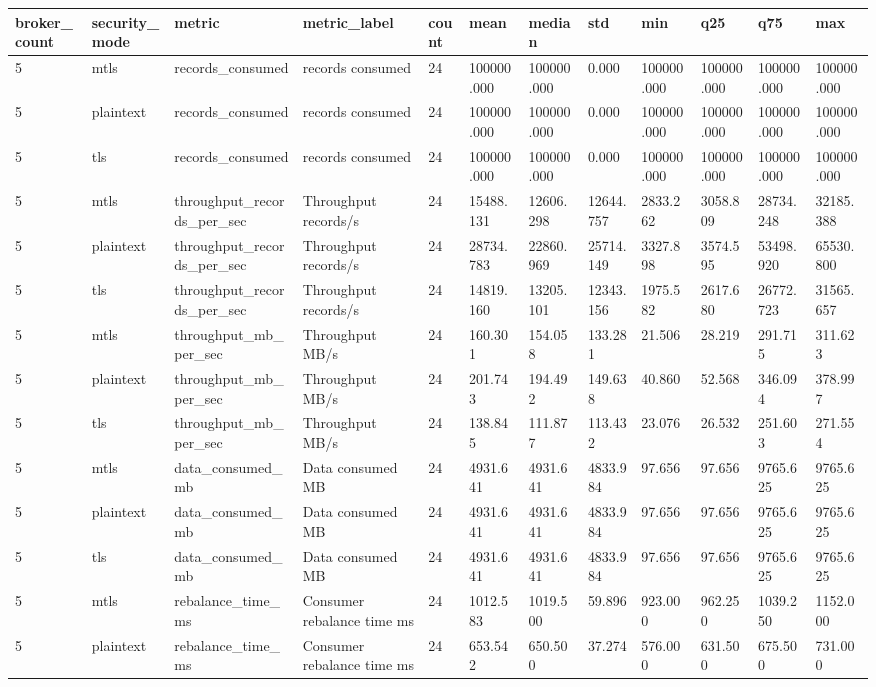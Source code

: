 \begin{longtable}{llllllllllll}
\hline
broker\_count & security\_mode & metric & metric\_label & count & mean & median & std & min & q25 & q75 & max \\
\hline
5 & mtls & records\_consumed & records consumed & 24 & 100000.000 & 100000.000 & 0.000 & 100000.000 & 100000.000 & 100000.000 & 100000.000 \\
5 & plaintext & records\_consumed & records consumed & 24 & 100000.000 & 100000.000 & 0.000 & 100000.000 & 100000.000 & 100000.000 & 100000.000 \\
5 & tls & records\_consumed & records consumed & 24 & 100000.000 & 100000.000 & 0.000 & 100000.000 & 100000.000 & 100000.000 & 100000.000 \\
5 & mtls & throughput\_records\_per\_sec & Throughput records/s & 24 & 15488.131 & 12606.298 & 12644.757 & 2833.262 & 3058.809 & 28734.248 & 32185.388 \\
5 & plaintext & throughput\_records\_per\_sec & Throughput records/s & 24 & 28734.783 & 22860.969 & 25714.149 & 3327.898 & 3574.595 & 53498.920 & 65530.800 \\
5 & tls & throughput\_records\_per\_sec & Throughput records/s & 24 & 14819.160 & 13205.101 & 12343.156 & 1975.582 & 2617.680 & 26772.723 & 31565.657 \\
5 & mtls & throughput\_mb\_per\_sec & Throughput MB/s & 24 & 160.301 & 154.058 & 133.281 & 21.506 & 28.219 & 291.715 & 311.623 \\
5 & plaintext & throughput\_mb\_per\_sec & Throughput MB/s & 24 & 201.743 & 194.492 & 149.638 & 40.860 & 52.568 & 346.094 & 378.997 \\
5 & tls & throughput\_mb\_per\_sec & Throughput MB/s & 24 & 138.845 & 111.877 & 113.432 & 23.076 & 26.532 & 251.603 & 271.554 \\
5 & mtls & data\_consumed\_mb & Data consumed MB & 24 & 4931.641 & 4931.641 & 4833.984 & 97.656 & 97.656 & 9765.625 & 9765.625 \\
5 & plaintext & data\_consumed\_mb & Data consumed MB & 24 & 4931.641 & 4931.641 & 4833.984 & 97.656 & 97.656 & 9765.625 & 9765.625 \\
5 & tls & data\_consumed\_mb & Data consumed MB & 24 & 4931.641 & 4931.641 & 4833.984 & 97.656 & 97.656 & 9765.625 & 9765.625 \\
5 & mtls & rebalance\_time\_ms & Consumer rebalance time ms & 24 & 1012.583 & 1019.500 & 59.896 & 923.000 & 962.250 & 1039.250 & 1152.000 \\
5 & plaintext & rebalance\_time\_ms & Consumer rebalance time ms & 24 & 653.542 & 650.500 & 37.274 & 576.000 & 631.500 & 675.500 & 731.000 \\

\end{longtable}
